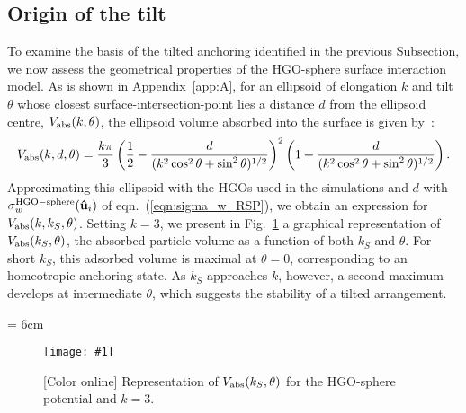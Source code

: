 \documentclass[aps,10pt,twocolumn]{revtex4}
\newcommand{\vecth}[1]{ \mathbf{\hat{#1} } }
\newcommand{\lp}{\left(}
\newcommand{\rp}{\right)}
\newcommand{\ui}{\vecth{u}_i}
\newlength{\picW}   %
\newcommand{\pic}[1]{\texttt{[image: \#1]}}
\begin{document}
\subsection{Origin of the tilt}
To examine the basis of the tilted anchoring identified in the previous Subsection, we now assess the geometrical
properties of the HGO-sphere surface interaction model. As is shown in Appendix~\ref{app:A}, for an ellipsoid of
elongation $k$ and tilt $\theta$ whose closest surface-intersection-point lies a distance $d$ from the ellipsoid
centre, $V_{\rm abs}(k,\theta)$, the ellipsoid volume absorbed into the surface is given by~:
\begin{equation}
    V_{\rm abs}(k,d,\theta)=\frac{k\pi}{3}\lp
    \frac{1}{2}-\frac{d}{(k^2\cos^2\theta+\sin^2\theta)^{1/2}}\rp^2  
    \lp 1 + \frac{d}{(k^2\cos^2\theta+\sin^2\theta)^{1/2}}\rp .
    \label{eqn:Ve_RSP}
\end{equation}
Approximating this ellipsoid with the HGOs used in the simulations and $d$ with $\sigma^{\rm HGO-sphere}_w(\ui)$
of eqn.~(\ref{eqn:sigma_w_RSP}), we obtain an expression for $V_{\rm abs}(k,k_S,\theta)$. Setting $k=3$, we
present in Fig.~\ref{fig:Ve_RSP_fkS} a graphical representation of $V_{\rm abs}(k_S,\theta)$, the absorbed
particle volume as a function of both $k_S$ and $\theta$. For short $k_S$, this adsorbed volume is maximal at
$\theta = 0$, corresponding to an homeotropic anchoring state. As $k_S$ approaches $k$, however, a second maximum
develops at intermediate $\theta$, which suggests the stability of a tilted arrangement.

\picW = 6cm
\begin{figure}
    \centering
    \pic{fig_05.ps}
    \caption{[Color online] Representation of $V_{\rm abs}(k_S,\theta)$ for the HGO-sphere potential and $k=3$.}
    \label{fig:Ve_RSP_fkS}
\end{figure}
\end{document}
